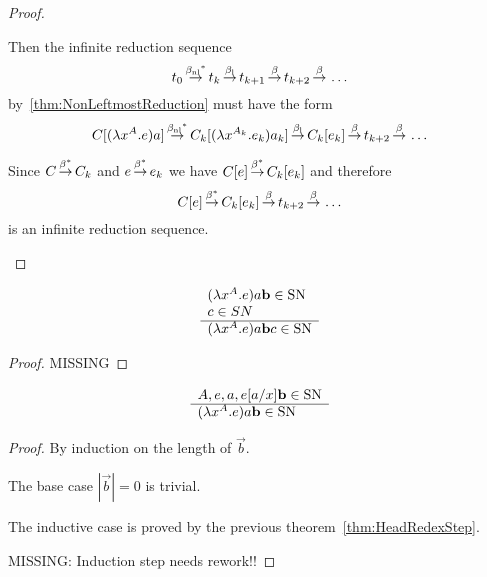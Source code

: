 \begin{theorem}
\begin{proof}
\begin{enumerate}
                Then the infinite reduction sequence
                $$
                t_0
                {{\,\stackrel{{{\beta_{\text{nl}}}}^*}{\to}\,}}
                t_k
                {\,\stackrel{{\beta_{\text{l}}}}{\to}\,}
                t_{k+1}
                {\,\stackrel{\beta}{\to}\,}
                t_{k+2}
                {\,\stackrel{\beta}{\to}\,}
                \ldots
                $$
                by~\ref{thm:NonLeftmostReduction}
                must have the form
                $$
                C[(\lambda x^{A}. e) a]
                {{\,\stackrel{{{\beta_{\text{nl}}}}^*}{\to}\,}}
                C_k[(\lambda x^{A_k}. e_k) a_k]
                {\,\stackrel{{\beta_{\text{l}}}}{\to}\,}
                C_k[e_k]
                {\,\stackrel{\beta}{\to}\,}
                t_{k+2}
                {\,\stackrel{\beta}{\to}\,}
                \ldots
                $$

                Since $C {\,\stackrel{\beta^*}{\to}\,} C_k$ and $e {\,\stackrel{\beta^*}{\to}\,} e_k$ we have $C[e]
                {\,\stackrel{\beta^*}{\to}\,} C_k[e_k]$ and therefore
                $$
                C[e] {\,\stackrel{\beta^*}{\to}\,} C_k[e_k] {\,\stackrel{\beta}{\to}\,} t_{k+2} {\,\stackrel{\beta}{\to}\,} \ldots
                $$
                is an infinite reduction sequence.
        \end{enumerate}
    \end{proof}
\end{theorem}




\begin{theorem}
    \label{thm:HeadRedexStep}
    $$
    \begin{array}{l} 
        (\lambda x^A. e) a {\mathbf b} \in {\text{SN}}
        \\
        c \in SN
     \\ \hline 
        (\lambda x^A. e) a {\mathbf b} c \in {\text{SN}}
    \end{array}
    $$
    \begin{proof}
        MISSING
    \end{proof}
\end{theorem}





\begin{theorem}
    \label{thm:StronglyNormalizingRedex}
    $$
    \begin{array}{l} 
        A, e, a, e[a/x] {\mathbf b}  \in {\text{SN}}
     \\ \hline 
        (\lambda x^A. e) a {\mathbf b} \in {\text{SN}}
    \end{array}
    $$
    \begin{proof} By induction on the length of $\vec b$.

        The base case $|\vec b| = 0$ is trivial.

        The inductive case is proved by the previous
        theorem~\ref{thm:HeadRedexStep}.

        MISSING: Induction step needs rework!!
    \end{proof}
\end{theorem}








